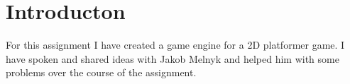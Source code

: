 \section{Introducton}
\label{01}

For this assignment I have created a game engine for a 2D platformer game. I have spoken and shared ideas with Jakob Melnyk and helped him with some problems over the course of the assignment.